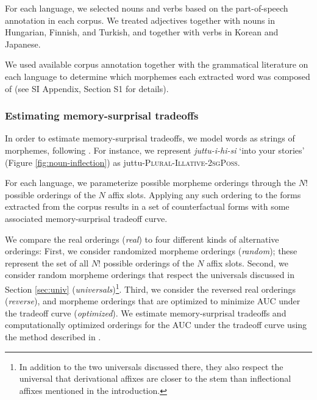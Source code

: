 \documentclass[man]{apa7}
\newcommand{\citet}{\Textcite}
\newcommand{\jd}[1]{\textcolor{Pink}{[jd: #1]}}
\begin{document}
For each language, we selected nouns and verbs based on the part-of-speech annotation in each corpus.
We treated adjectives together with nouns in Hungarian, Finnish, and Turkish, and together with verbs in Korean and Japanese.

We used available corpus annotation together with the grammatical literature on each language to determine which morphemes each extracted word was composed of (see SI Appendix, Section S1 for details).



\subsubsection{Estimating memory-surprisal tradeoffs}

In order to estimate memory-surprisal tradeoffs, we model words as strings of morphemes, following \citet{Hahn2020modeling}.
For instance, we represent \textit{juttu-i-hi-si} `into your stories' (Figure \ref{fig:noun-inflection}) as juttu-\textsc{Plural}-\textsc{Illative}-\textsc{2sgPoss}.

For each language, we parameterize possible morpheme orderings through the $N!$ possible orderings of the $N$ affix slots.
Applying any such ordering to the forms extracted from the corpus results in a set of counterfactual forms with some associated memory-surprisal tradeoff curve.


We compare the real orderings (\textit{real}) to four different kinds of alternative orderings:
First, we consider randomized morpheme orderings (\textit{random}); these represent the set of all $N!$ possible orderings of the $N$ affix slots.
Second, we consider random morpheme orderings that respect the universals discussed in Section \ref{sec:univ} (\textit{universals})\footnote{In addition to the two universals discussed there, they also respect the universal that derivational affixes are closer to the stem than inflectional affixes mentioned in the introduction.}.
Third, we consider the reversed real orderings (\textit{reverse}), and morpheme orderings that are optimized to minimize AUC under the tradeoff curve (\textit{optimized}).  We estimate memory-surprisal tradeoffs and computationally optimized orderings for the AUC under the tradeoff curve using the method described in \citet{Hahn2020modeling}.
\end{document}
